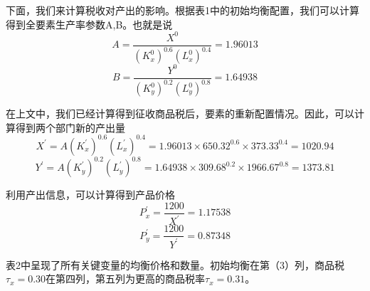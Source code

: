 \documentclass[cn,10pt,math=newtx,citestyle=gb7714-2015,bibstyle=gb7714-2015]{elegantbook}
\begin{document}
	下面，我们来计算税收对产出的影响。根据表1中的初始均衡配置，我们可以计算得到全要素生产率参数A,B。也就是说
	$$A=\frac{X^0}{(K_x^0)^{0.6}(L_x^0)^{0.4}}=1.96013$$
	$$B=\frac{Y^0}{(K_y^0)^{0.2}(L_y^0)^{0.8}}=1.64938$$
	
	在上文中，我们已经计算得到征收商品税后，要素的重新配置情况。因此，可以计算得到两个部门新的产出量
	$$X^{'}=A(K_x^{'})^{0.6}(L_x^{'})^{0.4}=1.96013\times 650.32^{0.6}\times 373.33^{0.4}=1020.94$$
	$$Y^{'}=A(K_y^{'})^{0.2}(L_y^{'})^{0.8}=1.64938\times 309.68^{0.2}\times 1966.67^{0.8}=1373.81$$
	
	利用产出信息，可以计算得到产品价格
	$$P_x^{'}=\frac{1200}{X^{'}}=1.17538$$
	$$P_y^{'}=\frac{1200}{Y^{'}}=0.87348$$
	
	表2中呈现了所有关键变量的均衡价格和数量。初始均衡在第（3）列，商品税$\tau_x=0.30$在第四列，第五列为更高的商品税率$\tau_x=0.31$。
	
\end{document}
